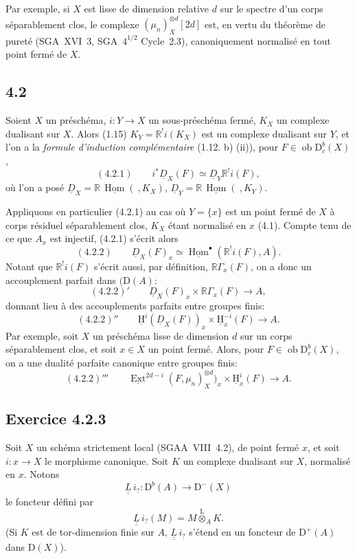 \documentclass[11pt]{article}
\providecommand{\uH}{\underline{\mathrm H}}
\DeclareMathOperator{\Hom}{Hom}
\DeclareMathOperator{\Ext}{Ext}
\newcommand{\R}{\mathbb{R}}\newcommand{\RHomCore}{\mathbb{R}\mathrm{Hom}}
\newcommand{\D}{\mathrm{D}}
\newcommand{\ob}{\operatorname{ob}}
\providecommand{\Hom}{\operatorname{Hom}}
\providecommand{\ob}{\operatorname{ob}}
\providecommand{\R}{\mathrm R}
\providecommand{\Hom}{\operatorname{Hom}}
\begin{document}
Par
exemple, si $X$ est lisse de dimension relative $d$ sur le spectre d'un corps séparablement clos, le complexe $(\mu_n)_X^{\otimes d}[2d]$ est, en vertu du théorème de pureté (SGA~XVI~3, SGA~$4^{1/2}$ Cycle~2.3), canoniquement normalisé en tout point fermé de $X$.

\subsection*{4.2}
Soient $X$ un préschéma, $i:Y\to X$ un sous-préschéma fermé, $K_X$ un complexe dualisant sur $X$. Alors (1.15) $K_Y=\R^{!}i(K_X)$ est un complexe dualisant sur $Y$, et l'on a la \emph{formule d'induction complémentaire} (1.12. b) (ii)), pour $F\in \ob\D_c^b(X)$,
\[
(4.2.1)\qquad i^*\underline{D}_X(F)\simeq\underline{D}_Y\R^{!}i(F),
\]
où l'on a posé $\underline{D}_X=\R\,\underline{\Hom}(\ ,K_X)$, $\underline{D}_Y=\R\,\underline{\Hom}(\ ,K_Y)$.

Appliquons en particulier (4.2.1) au cas où $Y=\{x\}$ est un point fermé de $X$ à corps résiduel séparablement clos, $K_X$ étant normalisé en $x$ (4.1). Compte tenu de ce que $A_x$ est injectif, (4.2.1) s'écrit alors
\[
(4.2.2)\qquad \underline{D}_X(F)_x\simeq\underline{\Hom}^{\bullet}(\R^{!}i(F),A).
\]
Notant que $\R^{!}i(F)$ s'écrit aussi, par définition, $\R\Gamma_x(F)$, on a donc un accouplement parfait dans $(\D(A)$:
\[
(4.2.2)'\qquad \underline{D}_X(F)_x\times \R\Gamma_x(F)\longrightarrow A,
\]
donnant lieu à des accouplements parfaits entre groupes finis:
\[
(4.2.2)''\qquad \uH^i(\underline{D}_X(F))_x\times \uH_x^{-i}(F)\longrightarrow A.
\]
Par exemple, soit $X$ un préschéma lisse de dimension $d$ sur un corps séparablement clos, et soit $x\in X$ un point fermé. Alors, pour $F\in\ob\D_c^b(X)$, on a une dualité parfaite canonique entre groupes finis:
\[
(4.2.2)'''\qquad \underline{\Ext}^{2d-i}(F,\mu_n)_X^{\otimes d})_x\times \uH_x^i(F)\longrightarrow A.
\]

\subsection*{Exercice 4.2.3}
Soit $X$ un schéma strictement local (SGAA~VIII~4.2), de point fermé $x$, et soit $i:x\to X$ le morphisme canonique. %
Soit $K$ un complexe dualisant sur $X$, normalisé en $x$. Notons
\[
\underline{\underline{L}}\, i_? : \D^b(A)\longrightarrow \D^-(X)
\]
le foncteur défini par
\[
\underline{\underline{L}}\, i_?(M)=M\overset{\mathrm{L}}{\otimes}_A K.
\]
(Si $K$ est de tor-dimension finie sur $A$, $\underline{\underline{L}}\, i_?$ s'étend en un foncteur de $\D^+(A)$ dans $\D(X)$).
\end{document}
